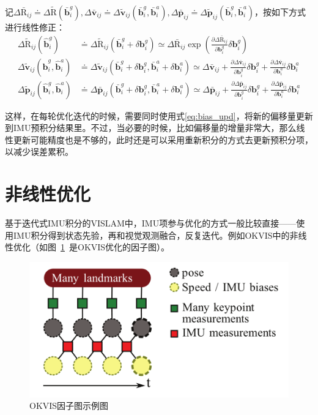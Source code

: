 记$\Delta\bar{\mathrm R}_{ij}\doteq\Delta\tilde{\mathrm R}(\bar{\bm b}^g_i), \Delta\bar{\bm v}_{ij}\doteq\Delta\tilde{\bm v}_{ij}(\bar{\bm b}^g_i,\bar{\bm b}^a_i), \Delta\bar{\bm p}_{ij}\doteq\Delta\tilde{\bm p}_{ij}(\bar{\bm b}^g_i,\bar{\bm b}^a_i)$，按如下方式进行线性修正：
\begin{equation}
\begin{aligned}
    \Delta\tilde{\mathrm R}_{ij}(\hat{\bm b}_i^g)
    &\doteq \Delta\tilde{\mathrm R}_{ij}(\bar{\bm b}^g_i + \delta\bm{b}^g_i)
    \simeq \Delta\bar{\mathrm R}_{ij}
    \exp\left(
      \tfrac{\partial\Delta\bar{\mathrm R}_{ij}}{\partial\bm{b}^g_i}
      \delta\bm{b}^g_i
    \right) \\
    \Delta\tilde{\bm v}_{ij}(\hat{\bm b}^g_i,\hat{\bm b}^a_i)
    &\doteq \Delta\tilde{\bm v}_{ij}(
    \bar{\bm b}^g_i + \delta\bm{b}^g_i,
    \bar{\bm b}^a_i + \delta\bm{b}^a_i)
    \simeq \Delta\bar{\bm v}_{ij} +
    \tfrac{\partial\Delta\bar{\bm v}_{ij}}{\partial\bm{b}^g_i}
    \delta\bm{b}^g_i +
    \tfrac{\partial\Delta\bar{\bm v}_{ij}}{\partial\bm{b}^a_i}
    \delta\bm{b}^a_i \\
    \Delta\tilde{\bm p}_{ij}(\hat{\bm b}^g_i,\hat{\bm b}^a_i)
    &\doteq \Delta\bar{\bm p}_{ij}(
    \bar{\bm b}^g_i + \delta\bm{b}^g_i,
    \bar{\bm b}^a_i + \delta\bm{b}^a_i)
    \simeq \Delta\bar{\bm p}_{ij} +
    \tfrac{\partial\Delta\bar{\bm p}_{ij}}{\partial\bm{b}^g_i}
    \delta\bm{b}^g_i +
    \tfrac{\partial\Delta\bar{\bm p}_{ij}}{\partial\bm{b}^a_i}
    \delta\bm{b}^a_i
\end{aligned}
\label{eq:bias_upd}
\end{equation}

这样，在每轮优化迭代的时候，需要同时使用式\eqref{eq:bias_upd}，将新的偏移量更新到IMU预积分结果里。不过，当必要的时候，比如偏移量的增量非常大，那么线性更新可能精度也是不够的，此时还是可以采用重新积分的方式去更新预积分项，以减少误差累积。

\section{非线性优化}

基于迭代式IMU积分的VISLAM中，IMU项参与优化的方式一般比较直接——使用IMU积分得到状态先验，再和视觉观测融合，反复迭代。例如OKVIS中的非线性优化（如图~\ref{fig:okvis}~是OKVIS优化的因子图）。

\begin{figure}[htb!]
    \centering
    \includegraphics[width=.5\textwidth]{Pictures/okvis.png}
    \caption{OKVIS因子图示例图\citep{leutenegger2015keyframe}}
    \label{fig:okvis}
\end{figure}

